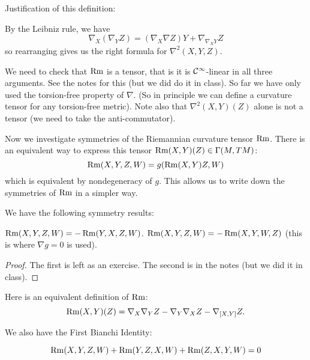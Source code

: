 Justification of this definition:
\begin{enum}
  \io
  By the Leibniz rule, we have
  \[ \nabla_X(\nabla_YZ) = (\nabla_X\nabla Z)Y + \nabla_{\nabla_XY}Z \]
  so rearranging gives us the right formula for $\nabla^2(X,Y,Z)$.

  \io
  We need to check that $\operatorname{Rm}$ is a tensor, that is it is $\mathcal{C}^\infty$-linear in all three arguments.
  See the notes for this (but we did do it in class).
  So far we have only used the torsion-free property of $\nabla$.
  (So in principle we can define a curvature tensor for any torsion-free metric).
  Note also that $\nabla^2(X,Y)(Z)$ alone is not a tensor (we need to take the anti-commutator).
\end{enum}

Now we investigate symmetries of the Riemannian curvature tensor $\operatorname{Rm}$.
There is an equivalent way to express this tensor $\operatorname{Rm}(X,Y)(Z)\in\Gamma(M,TM)$:
\[ \operatorname{Rm}(X,Y,Z,W) = g(\operatorname{Rm}(X,Y)Z,W) \]
which is equivalent by nondegeneracy of $g$.
This allows us to write down the symmetries of $\operatorname{Rm}$ in a simpler way.

We have the following symmetry results:
\begin{prop}
  \lv
  \begin{enum}
    \io $\operatorname{Rm}(X,Y,Z,W) = -\operatorname{Rm}(Y,X,Z,W)$.
    \io $\operatorname{Rm}(X,Y,Z,W) = -\operatorname{Rm}(X,Y,W,Z)$ (this is where $\nabla g=0$ is used).
  \end{enum}
\end{prop}

\begin{proof}
  The first is left as an exercise.
  The second is in the notes (but we did it in class).
\end{proof}

\begin{rmk}
  Here is an equivalent definition of $\operatorname{Rm}$:
  \[ \operatorname{Rm}(X,Y)(Z) = \nabla_X \nabla_Y Z - \nabla_Y \nabla_X Z - \nabla_{[X,Y]}Z. \]
\end{rmk}

We also have the First Bianchi Identity:
\begin{prop}
  \[ \operatorname{Rm}(X,Y,Z,W) + \operatorname{Rm}(Y,Z,X,W) + \operatorname{Rm}(Z,X,Y,W) = 0 \]
\end{prop}

